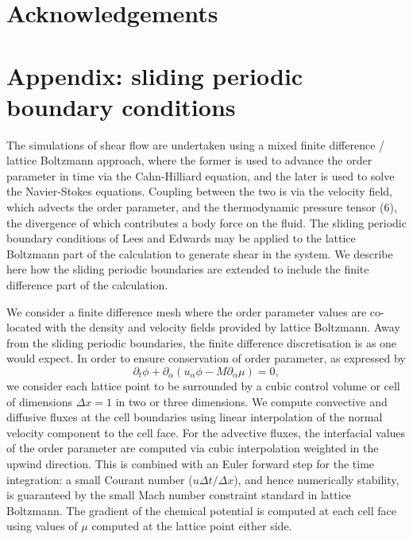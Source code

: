 \documentclass[8.5pt,twoside,twocolumn]{article}
\begin{document}
\section{Acknowledgements}


\section{Appendix: sliding periodic boundary conditions}

The simulations of shear flow are undertaken using a mixed finite
difference / lattice Boltzmann approach, where the former is used
to advance the order parameter in time via the Cahn-Hilliard equation,
and the later is used to solve the Navier-Stokes equations.
Coupling between the two is
via the velocity field, which advects the order parameter, and
the thermodynamic pressure tensor (6), the divergence of which
contributes a body force on the fluid. The sliding periodic
boundary conditions of Lees and Edwards\cite{leesedwards} may be
applied to the lattice Boltzmann part of the calculation
\cite{Wagner02,adhikari2005} to generate shear in the system. We
describe here how the sliding periodic boundaries are extended to
include the finite difference part of the calculation.

We consider a finite difference mesh where the order parameter
values are co-located with the density and velocity fields provided
by lattice Boltzmann. Away from the sliding periodic boundaries, the
finite difference discretisation is as one would expect.
In order to ensure conservation of order parameter, as expressed by
\begin{equation}
\partial_t \phi + \partial_\alpha (u_\alpha \phi - M\partial_\alpha \mu) = 0,
\end{equation}
we consider each lattice point to be surrounded by a cubic control volume or
cell
of dimensions $\Delta x = 1$ in two or three dimensions.
We compute convective and diffusive fluxes at the cell boundaries using
linear interpolation of the normal velocity component to the cell face.
For the advective fluxes, the interfacial values of the order parameter
are computed via cubic interpolation weighted in the upwind direction.
This is combined with an Euler forward step for the time integration:
a small Courant number ($u\Delta t/\Delta x$), and hence numerically
stability, is guaranteed by the small Mach number constraint
standard in lattice Boltzmann. The gradient of the chemical potential
is computed at each cell face using values of $\mu$ computed at the
lattice point either side.
\end{document}
